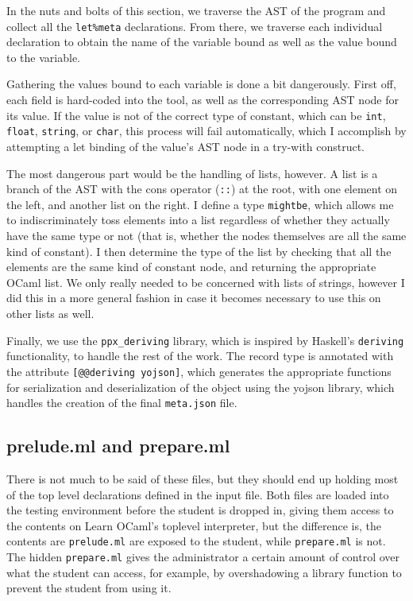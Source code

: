 \documentclass[11pt]{article} %
\begin{document}
In the nuts and bolts of this section, we traverse the AST of the program and collect all the \verb+let%meta+ declarations. From there, we traverse each individual declaration to obtain the name of the variable bound as well as the value bound to the variable.

Gathering the values bound to each variable is done a bit dangerously. First off, each field is hard-coded into the tool, as well as the corresponding AST node for its value. If the value is not of the correct type of constant, which can be \verb+int+, \verb+float+, \verb+string+, or \verb+char+, this process will fail automatically, which I accomplish by attempting a let binding of the value's AST node in a try-with construct.

The most dangerous part would be the handling of lists, however. A list is a branch of the AST with the cons operator (\verb+::+) at the root, with one element on the left, and another list on the right. I define a type \verb+mightbe+, which allows me to indiscriminately toss elements into a list regardless of whether they actually have the same type or not (that is, whether the nodes themselves are all the same kind of constant). I then determine the type of the list by checking that all the elements are the same kind of constant node, and returning the appropriate OCaml list. We only really needed to be concerned with lists of strings, however I did this in a more general fashion in case it becomes necessary to use this on other lists as well.

Finally, we use the \verb+ppx_deriving+ library, which is inspired by Haskell's \verb+deriving+ functionality, to handle the rest of the work. The record type is annotated with the attribute \verb+[@@deriving yojson]+, which generates the appropriate functions for serialization and deserialization of the object using the yojson library, which handles the creation of the final \verb+meta.json+ file.

\subsection{prelude.ml and prepare.ml}

There is not much to be said of these files, but they should end up holding most of the top level declarations defined in the input file. Both files are loaded into the testing environment before the student is dropped in, giving them access to the contents on Learn OCaml's toplevel interpreter, but the difference is, the contents are \verb+prelude.ml+ are exposed to the student, while \verb+prepare.ml+ is not. The hidden \verb+prepare.ml+ gives the administrator a certain amount of control over what the student can access, for example, by overshadowing a library function to prevent the student from using it.
\end{document}
